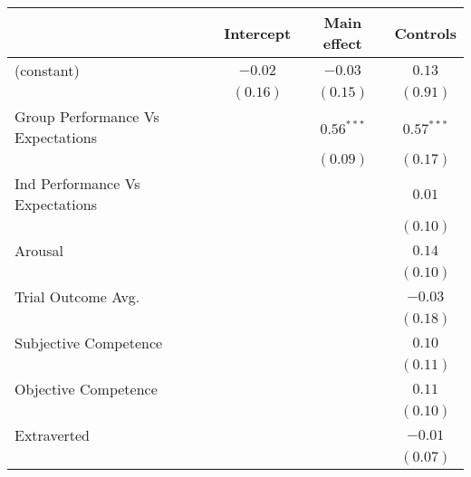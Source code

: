
\begin{table}
\begin{center}
\begin{tabular}{l c c c }
\toprule
 & Intercept & Main effect & Controls \\
\midrule
(constant)                                          & $-0.02$  & $-0.03$               & $0.13$                \\
                                                    & $(0.16)$ & $(0.15)$              & $(0.91)$              \\
Group Performance Vs Expectations                   &          & $\mathbf{0.56}^{***}$ & $\mathbf{0.57}^{***}$ \\
                                                    &          & $(0.09)$              & $(0.17)$              \\
Ind Performance Vs Expectations                     &          &                       & $0.01$                \\
                                                    &          &                       & $(0.10)$              \\
Arousal                                             &          &                       & $0.14$                \\
                                                    &          &                       & $(0.10)$              \\
Trial Outcome Avg.                                  &          &                       & $-0.03$               \\
                                                    &          &                       & $(0.18)$              \\
Subjective Competence                               &          &                       & $0.10$                \\
                                                    &          &                       & $(0.11)$              \\
Objective Competence                                &          &                       & $0.11$                \\
                                                    &          &                       & $(0.10)$              \\
Extraverted                                         &          &                       & $-0.01$               \\
                                                    &          &                       & $(0.07)$              \\

\end{tabular}
\end{center}
\end{table}

